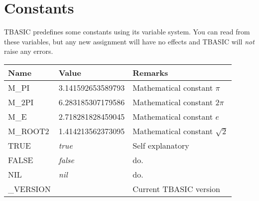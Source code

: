 \section{Constants}

TBASIC predefines some constants using its variable system. You can read from these variables, but any new assignment will have no effects and TBASIC will \emph{not} raise any errors.

\begin{tabularx}{\textwidth}{l l X}
	\textbf{Name} & \textbf{Value} & \textbf{Remarks}
	\\
	\endhead
	M\_PI    & 3.141592653589793 & Mathematical constant $\pi$ \\
	M\_2PI   & 6.283185307179586 & Mathematical constant $2\pi$ \\
	M\_E     & 2.718281828459045 & Mathematical constant $e$ \\
	M\_ROOT2 & 1.414213562373095 & Mathematical constant $\sqrt{2}$ \\
	TRUE    & \emph{true} & Self explanatory \\
	FALSE   & \emph{false} & do. \\
	NIL     & \emph{nil} & do. \\
	\_VERSION & \tbasver & Current TBASIC version \\
\end{tabularx}
